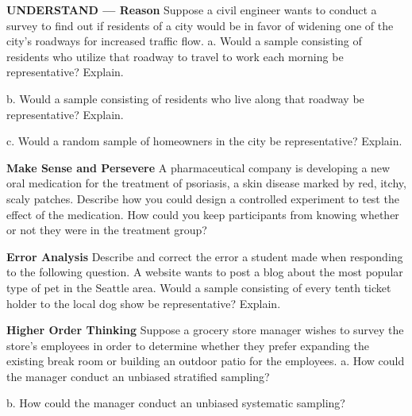 \documentclass{article}
\newenvironment{practice}[2]{}{}        %
\newcommand{\answer}[1]{}               %
\newcommand{\te}[1]{}                   %
\begin{document}
\begin{practice}{7}{2}
\textbf{UNDERSTAND — Reason} Suppose a civil engineer wants to conduct a survey to find out if residents of a city would be in favor of widening one of the city's roadways for increased traffic flow.
a. Would a sample consisting of residents who utilize that roadway to travel to work each morning be representative? Explain.
\answer{a. No; it would be biased because they will ultimately benefit from the increased traffic flow.}
b. Would a sample consisting of residents who live along that roadway be representative? Explain.
\answer{b. No; it would be biased because they will welcome neither the disruption caused by the construction nor the increased traffic flow.}
c. Would a random sample of homeowners in the city be representative? Explain.
\answer{c. This is unbiased, and each homeowner within the city has an equal chance of being selected for the sample.}
\end{practice}
\begin{practice}{8}{3}
\textbf{Make Sense and Persevere} A pharmaceutical company is developing a new oral medication for the treatment of psoriasis, a skin disease marked by red, itchy, scaly patches. Describe how you could design a controlled experiment to test the effect of the medication. How could you keep participants from knowing whether or not they were in the treatment group?
\answer{Control group—people with psoriasis given a placebo; Experimental group—people with psoriasis given the new medication; Everyone's medication looks and feels the same, so no one knows if he or she is getting a placebo or medication.}
\end{practice}
\begin{practice}{9}{2}
\textbf{Error Analysis} Describe and correct the error a student made when responding to the following question.
A website wants to post a blog about the most popular type of pet in the Seattle area. Would a sample consisting of every tenth ticket holder to the local dog show be representative? Explain.
\te{Student work marked incorrect: Yes; since the sample is a systematic random sample, it would be representative of the population.}
\answer{While it is a systematic sampling method, it is biased towards dogs because all the members of the sample are ticket holders to a dog show.}
\end{practice}
\begin{practice}{10}{3}
\textbf{Higher Order Thinking} Suppose a grocery store manager wishes to survey the store's employees in order to determine whether they prefer expanding the existing break room or building an outdoor patio for the employees.
a. How could the manager conduct an unbiased stratified sampling?
\answer{a. The manager could randomly ask several employees within each department.}
b. How could the manager conduct an unbiased systematic sampling?
\answer{b. The manager could conduct a survey of every 10th employee in the alphabetized employee list.}
\end{practice}
\end{document}
